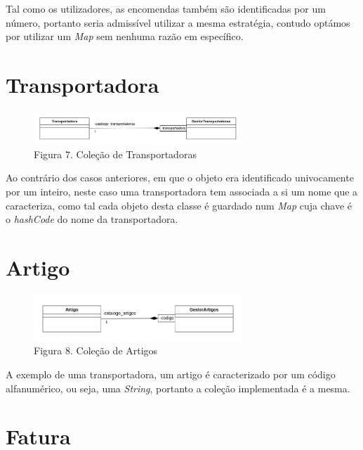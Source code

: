     Tal como os utilizadores, as encomendas também são identificadas por um número, portanto seria admissível utilizar a mesma estratégia, contudo optámos por utilizar um \textit{Map} sem nenhuma razão em específico.
    
    \section{Transportadora}

    \begin{figure}[hb!]
        \centering
        \vspace{-5pt}
        \includegraphics[width=0.7\textwidth]{imagens/13.png}
        \caption*{Figura 7. Coleção de Transportadoras}
    \end{figure}
    \vspace{8pt}

    Ao contrário dos casos anteriores, em que o objeto era identificado univocamente por um inteiro, neste caso uma transportadora tem associada a si um nome que a caracteriza, como tal cada objeto desta classe é guardado num \textit{Map} cuja chave é o \textit{hashCode} do nome da transportadora.

    \section{Artigo}

    \begin{figure}[hb!]
        \centering
        \vspace{-15pt}
        \includegraphics[width=0.7\textwidth]{imagens/4.png}
        \caption*{Figura 8. Coleção de Artigos}
    \end{figure}
    \vspace{8pt}

    A exemplo de uma transportadora, um artigo é caracterizado por um código alfanumérico, ou seja, uma \textit{String}, portanto a coleção implementada é a mesma.

    \section{Fatura}

